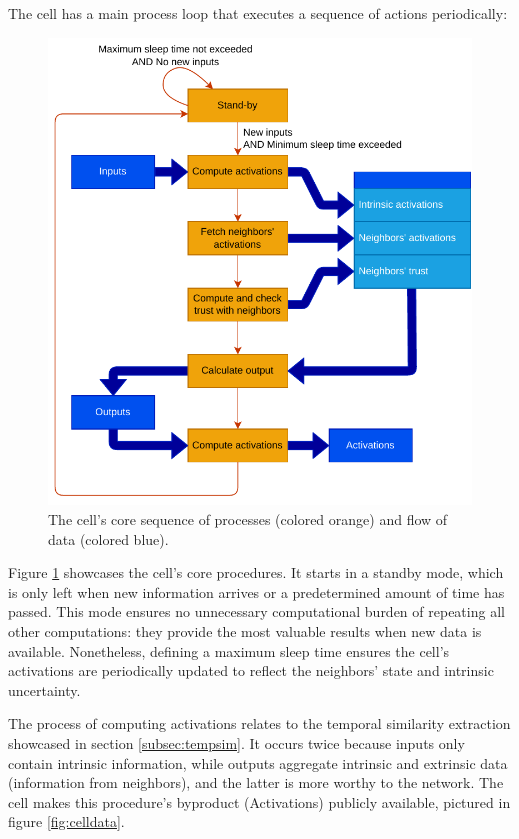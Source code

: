 The cell has a main process loop that executes a sequence of actions periodically: 

\begin{figure}[h!]
    \centering
    \includegraphics[width=12cm]{figures/chapter4/cell/processes.pdf}
    \caption{The cell's core sequence of processes (colored orange) and flow of data (colored blue).}
    \label{fig:cellprocesses}
\end{figure}

Figure \ref{fig:cellprocesses} showcases the cell's core procedures. It starts in a standby mode, which is only left when new information arrives or a predetermined amount of time has passed. This mode ensures no unnecessary computational burden of repeating all other computations: they provide the most valuable results when new data is available. Nonetheless, defining a maximum sleep time ensures the cell's activations are periodically updated to reflect the neighbors' state and intrinsic uncertainty.

The process of computing activations relates to the temporal similarity extraction showcased in section \ref{subsec:tempsim}. It occurs twice because inputs only contain intrinsic information, while outputs aggregate intrinsic and extrinsic data (information from neighbors), and the latter is more worthy to the network. The cell makes this procedure's byproduct (Activations) publicly available, pictured in figure \ref{fig:celldata}.

